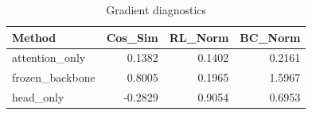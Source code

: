 \begin{table}[htbp]
\centering
\caption{Gradient diagnostics}
\label{tab:grad-diag}
\begin{tabular}{lrrr}
\toprule
\textbf{Method} & \textbf{Cos\_Sim} & \textbf{RL\_Norm} & \textbf{BC\_Norm} \\
\midrule
attention\_only & 0.1382 & 0.1402 & 0.2161 \\
frozen\_backbone & 0.8005 & 0.1965 & 1.5967 \\
head\_only & -0.2829 & 0.9054 & 0.6953 \\
\bottomrule
\end{tabular}
\end{table}